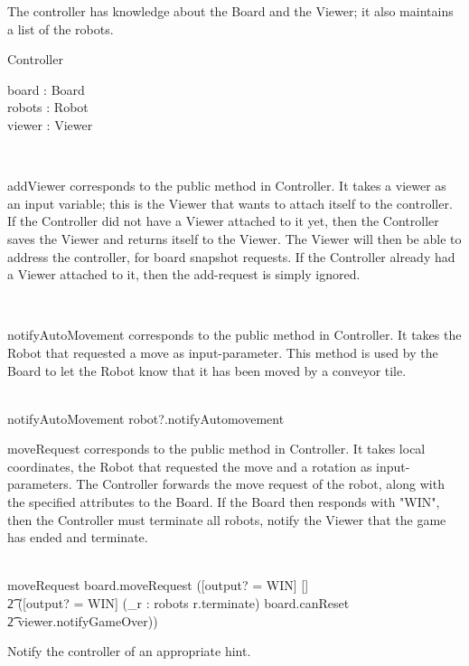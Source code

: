 The controller has knowledge about the Board and the Viewer; it also maintains a list of the robots.
\begin{class}{Controller}
\begin{state}
board : Board \\
robots : \power Robot \\
viewer : Viewer
\end{state}\\
\begin{classcom}
addViewer corresponds to the public method in Controller. It takes a viewer as an input variable; this is the Viewer that wants to attach itself to the controller. If the Controller did not have a Viewer attached to it yet, then the Controller saves the Viewer and returns itself to the Viewer. The Viewer will then be able to address the controller, for board snapshot requests. If the Controller already had a Viewer attached to it, then the add-request is simply ignored.
\end{classcom} \\
\begin{classcom}
notifyAutoMovement corresponds to the public method in Controller. It takes the Robot that requested a move as input-parameter. This method is used by the Board to let the Robot know that it has been moved by a conveyor tile.
\end{classcom} \\
notifyAutoMovement \sdef robot?.notifyAutomovement \\
\znewpage
\begin{classcom}
moveRequest corresponds to the public method in Controller. It takes local coordinates, the Robot that requested the move and a rotation as input-parameters. The Controller forwards the move request of the robot, along with the specified attributes to the Board. If the Board then responds with "WIN", then the Controller must terminate all robots, notify the Viewer that the game has ended and terminate.
\end{classcom} \\
moveRequest \sdef board.moveRequest \comp ([output? \not = WIN] [] \\ \t2 ([output? = WIN] \wedge (\bigwedge_{r : robots} r.terminate) \wedge board.canReset \; \; \wedge \\ \t2 viewer.notifyGameOver)) \\
\begin{classcom}
Notify the controller of an appropriate hint.
\end{classcom} \\

\end{class}
